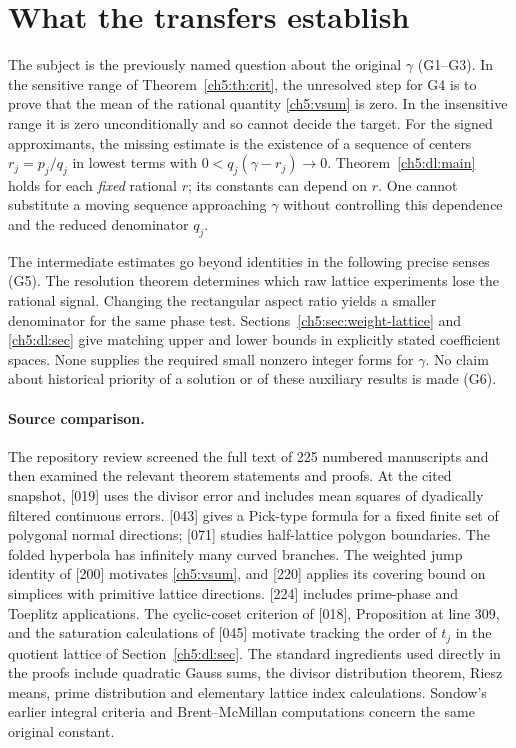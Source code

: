 \documentclass[11pt,a4paper,oneside,openany]{report}
\theoremstyle{remark}\newtheorem{remark}[theorem]{Remark}
\numberwithin{equation}{section}
\begin{document}
\section{What the transfers establish}
The subject is the previously named question about the original $\gamma$ (G1--G3). In the sensitive range of Theorem~\ref{ch5:th:crit}, the unresolved step for G4 is to prove that the mean of the rational quantity \eqref{ch5:vsum} is zero. In the insensitive range it is zero unconditionally and so cannot decide the target. For the signed approximants, the missing estimate is the existence of a sequence of centers $r_j=p_j/q_j$ in lowest terms with $0<q_j(\gamma-r_j)\to0$. Theorem~\ref{ch5:dl:main} holds for each \emph{fixed} rational $r$; its constants can depend on $r$. One cannot substitute a moving sequence approaching $\gamma$ without controlling this dependence and the reduced denominator $q_j$.

The intermediate estimates go beyond identities in the following precise senses (G5). The resolution theorem determines which raw lattice experiments lose the rational signal. Changing the rectangular aspect ratio yields a smaller denominator for the same phase test. Sections~\ref{ch5:sec:weight-lattice} and \ref{ch5:dl:sec} give matching upper and lower bounds in explicitly stated coefficient spaces. None supplies the required small nonzero integer forms for $\gamma$. No claim about historical priority of a solution or of these auxiliary results is made (G6).

\paragraph{Source comparison.}
The repository review screened the full text of 225 numbered manuscripts and then examined the relevant theorem statements and proofs. At the cited snapshot, [019] uses the divisor error and includes mean squares of dyadically filtered continuous errors. [043] gives a Pick-type formula for a fixed finite set of polygonal normal directions; [071] studies half-lattice polygon boundaries. The folded hyperbola has infinitely many curved branches. The weighted jump identity of [200] motivates \eqref{ch5:vsum}, and [220] applies its covering bound on simplices with primitive lattice directions. [224] includes prime-phase and Toeplitz applications. The cyclic-coset criterion of [018], Proposition at line 309, and the saturation calculations of [045] motivate tracking the order of $t_j$ in the quotient lattice of Section~\ref{ch5:dl:sec}. The standard ingredients used directly in the proofs include quadratic Gauss sums, the divisor distribution theorem, Riesz means, prime distribution and elementary lattice index calculations. Sondow's earlier integral criteria and Brent--McMillan computations concern the same original constant.
\end{document}
